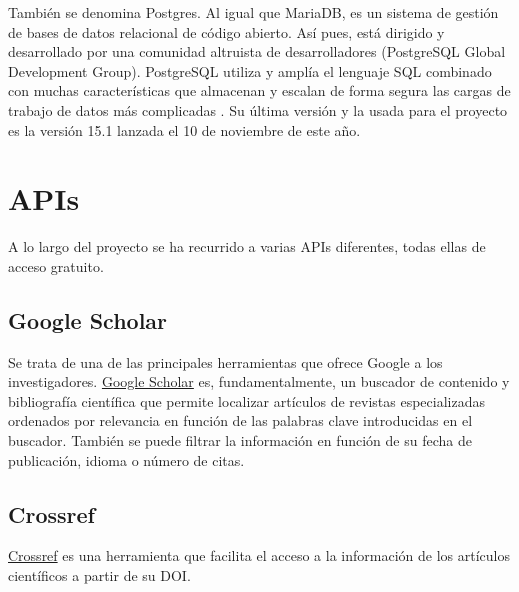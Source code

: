 
También se denomina Postgres. Al igual que MariaDB, es un sistema de gestión de bases de datos relacional de código abierto. Así pues, está dirigido y desarrollado por una comunidad altruista de desarrolladores (PostgreSQL Global Development Group).
PostgreSQL utiliza y amplía el lenguaje SQL combinado con muchas características que almacenan y escalan de forma segura las cargas de trabajo de datos más complicadas \cite{Postgresql.org}. 
Su última versión y la usada para el proyecto es la versión 15.1 lanzada el 10 de noviembre de este año.










\section{APIs}
A lo largo del proyecto se ha recurrido a varias APIs diferentes, todas ellas de acceso gratuito.

\subsection{Google Scholar}
Se trata de una de las principales herramientas que ofrece Google a los investigadores. \href{https://scholar.google.com/}{Google Scholar} es, fundamentalmente, un buscador de contenido y bibliografía científica que permite localizar artículos de revistas especializadas ordenados por relevancia en función de las palabras clave introducidas en el buscador. También se puede  filtrar la información en función de su fecha de publicación, idioma o número de citas.


\subsection{Crossref}
\href{https://www.crossref.org/}{Crossref} es una herramienta que facilita el  acceso a la información de los artículos científicos a partir de su DOI.


